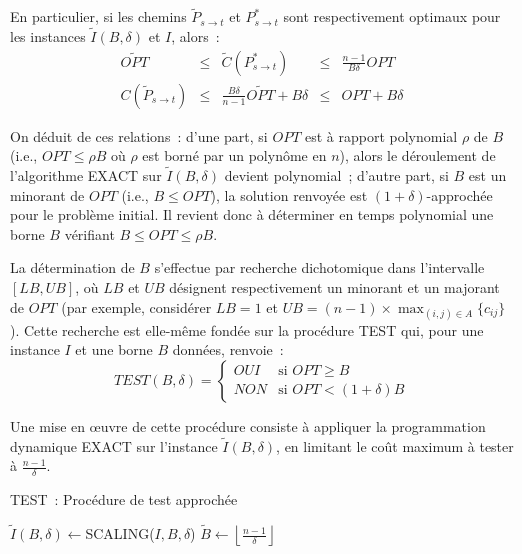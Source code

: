 \documentclass[10pt,francais]{llncs}
\begin{document}
{En particulier, si les chemins $\tilde{P}_{s\rightarrow t}$ et $P^*_{s\rightarrow t}$ sont respectivement optimaux pour les instances $\tilde{I}(B,\delta)$ et $I$, alors~:
$$\begin{array}{ccccc}
		\widetilde{OPT}
				&\leq 	&\tilde{C}(P^*_{s\rightarrow t})
				&\leq 	&\displaystyle \frac{n-1}{B\delta}OPT\\[7pt]
C(\tilde{P}_{s\rightarrow t})
				&\leq 	&\displaystyle\frac{B\delta}{n-1}\widetilde{OPT}+B\delta
				&\leq 	&OPT+B\delta
\end{array}$$

On d\'eduit de ces relations~: d'une part, si $OPT$ est \`a rapport polynomial $\rho$ de $B$ (i.e., $OPT\leq \rho B$ o\`u $\rho$ est born\'e par un polyn\^ome en $n$), alors le d\'eroulement de l'algorithme EXACT sur $\tilde{I}(B,\delta)$ devient polynomial~; d'autre part, si $B$ est un minorant de $OPT$  (i.e., $B\leq OPT$), la solution renvoy\'ee est $(1+\delta)$-approch\'ee pour le probl\`eme initial. Il revient donc \`a d\'eterminer en temps polynomial une borne $B$ v\'erifiant $B\leq OPT\leq \rho B$. 

La d\'etermination de $B$ s'effectue par recherche dichotomique dans l'intervalle $[LB,UB]$, o\`u $LB$ et $UB$ d\'esignent respectivement un minorant et un majorant de $OPT$ (par exemple, consid\'erer $LB=1$ et $\displaystyle UB=(n-1)\times\max_{(i,j)\in A}\{c_{ij}\}$). Cette recherche est elle-m\^eme fond\'ee sur la proc\'edure TEST qui, pour une instance $I$ et une borne $B$ donn\'ees, renvoie~:
$$TEST(B,\delta) =\left\{
\begin{array}{ll}
OUI & \textrm{si $OPT \geq B$}\\
NON & \textrm{si $OPT < (1+\delta)B$}
\end{array}
\right.
$$ 

\noindent Une mise en \oe{}uvre de cette proc\'edure consiste \`a appliquer la programmation dynamique EXACT sur l'instance $\tilde{I}(B,\delta)$, en limitant le co\^ut maximum \`a tester \`a $\displaystyle \frac{n-1}{\delta}$.

\begin{algorithm}\label{algo-test}
\caption{TEST~: Proc\'edure de test approch\'ee}
\Entree{$I$ instance, $B$ borne sur le co\^ut objectif, $\delta\in]0,n]$ erreur}
\BlankLine
{}
\BlankLine
$\tilde{I}(B,\delta)\leftarrow$SCALING($I,B,\delta$)\;
\BlankLine
$\displaystyle \tilde{B}\leftarrow\left\lfloor \frac{n-1}{\delta}\right\rfloor$\;
\BlankLine


\end{algorithm}}
\end{document}
